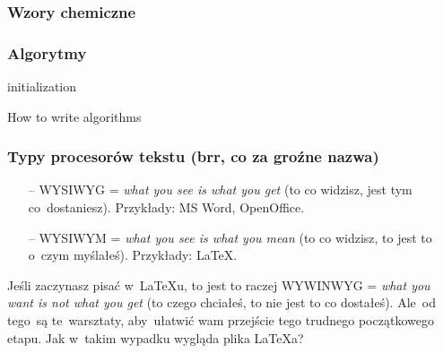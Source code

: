 \documentclass[10pt]{beamer}  %
\begin{document}
\begin{frame}[fragile]
  \frametitle{Wzory chemiczne}




\end{frame}





\begin{frame}[fragile]
  \frametitle{Algorytmy}


\begin{algorithm}[H]
 initialization\;
 \caption{How to write algorithms}
\end{algorithm}

\end{frame}





\begin{frame}
  \frametitle{Typy procesorów tekstu (brr, co za groźne nazwa)}


    \begin{itemize}
    \item[--] WYSIWYG = \emph{what you see is what you get} (to co
      widzisz, jest tym co~dostaniesz). Przykłady: MS Word,
      OpenOffice.

    \item[--] WYSIWYM = \emph{what you see is what you mean} (to co
      widzisz, to jest to o~czym myślałeś). Przykłady: \LaTeX.

    \end{itemize}

    Jeśli zaczynasz pisać w~\LaTeX u, to jest to raczej WYWINWYG =
    \emph{what you want is not what you get} (to czego chciałeś, to
    nie jest to co dostałeś). Ale~od tego~są te~warsztaty, aby~ułatwić
    wam przejście tego trudnego początkowego etapu. Jak w~takim
    wypadku wygląda plika \LaTeX a?

\end{frame}
\end{document}
